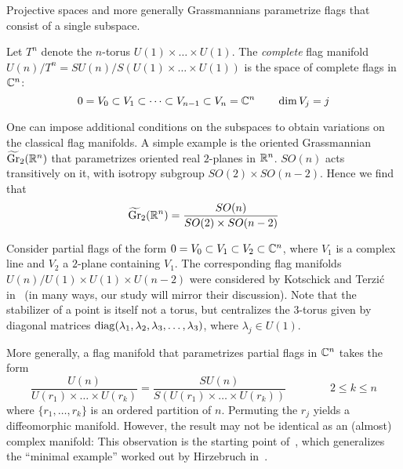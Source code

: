 \begin{ex}\leavevmode
	\begin{numberedlist}
		\item Projective spaces and more generally Grassmannians parametrize flags that consist of a single subspace.
		\item Let $T^n$ denote the $n$-torus $U(1)\times\dots\times U(1)$. The \emph{complete} flag manifold $U(n)/T^n=SU(n)/S(U(1)\times\dots\times U(1))$ is the space of complete flags in $\mathbb{C}^n$:
		\begin{equation*}
			0=V_0\subset V_1\subset\dots \subset V_{n-1}\subset V_n=\mathbb{C}^n \qquad \dim V_j=j
		\end{equation*}
		\item One can impose additional conditions on the subspaces to obtain variations on the classical flag manifolds. A simple example is the oriented Grassmannian $\widetilde {\operatorname{Gr}}_2(\mathbb{R}^n)$ that parametrizes oriented real $2$-planes in $\mathbb{R}^n$. $SO(n)$ acts transitively on it, with isotropy subgroup $SO(2)\times SO(n-2)$. Hence we find that
		\begin{equation*}
			\widetilde {\operatorname{Gr}}_2(\mathbb{R}^n)=\frac{SO(n)}{SO(2)\times SO(n-2)}
		\end{equation*}
		\item Consider partial flags of the form $0=V_0\subset V_1\subset V_2\subset \mathbb{C}^n$, where $V_1$ is a complex line and $V_2$ a $2$-plane containing $V_1$. The corresponding flag manifolds $U(n)/U(1)\times U(1)\times U(n-2)$ were considered by Kotschick and Terzi\'c in~\cite{KT2009} (in many ways, our study will mirror their discussion). Note that the stabilizer of a point is itself not a torus, but centralizes the $3$-torus given by diagonal matrices $\operatorname{diag}(\lambda_1,\lambda_2,\lambda_3,\dots,\lambda_3)$, where $\lambda_j\in U(1)$.
		\item More generally, a flag manifold that parametrizes partial flags in $\mathbb{C}^n$ takes the form 
		\begin{equation*}
			\frac{U(n)}{U(r_1)\times\dots\times U(r_k)}
			=\frac{SU(n)}{S(U(r_1)\times\dots\times U(r_k))} \qquad \qquad 2\leq k\leq n
		\end{equation*}
		where $\{r_1,\dots,r_k\}$ is an ordered partition of $n$. Permuting the $r_j$ yields a diffeomorphic manifold. However, the result may not be identical as an (almost) complex manifold: This observation is the starting point of~\cite{KT2009}, which generalizes the ``minimal example'' worked out by Hirzebruch in~\cite{Hir2005}.
	\end{numberedlist}
\end{ex}

